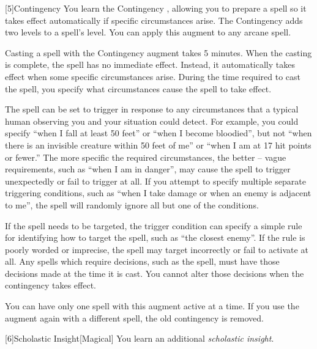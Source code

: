         [5]{Contingency}  You learn the Contingency , allowing you to prepare a spell so it takes effect automatically if specific circumstances arise.
        The Contingency  adds two levels to a spell's level.
        You can apply this augment to any arcane spell.

        Casting a spell with the Contingency augment takes 5 minutes.
        When the casting is complete, the spell has no immediate effect.
        Instead, it automatically takes effect when some specific circumstances arise.
        During the time required to cast the spell, you specify what circumstances cause the spell to take effect.

        The spell can be set to trigger in response to any circumstances that a typical human observing you and your situation could detect.
        For example, you could specify ``when I fall at least 50 feet'' or ``when I become bloodied'', but not ``when there is an invisible creature within 50 feet of me'' or ``when I am at 17 hit points or fewer.''
        The more specific the required circumstances, the better -- vague requirements, such as ``when I am in danger'', may cause the spell to trigger unexpectedly or fail to trigger at all.
        If you attempt to specify multiple separate triggering conditions, such as ``when I take damage or when an enemy is adjacent to me'', the spell will randomly ignore all but one of the conditions.

        If the spell needs to be targeted, the trigger condition can specify a simple rule for identifying how to target the spell, such as ``the closest enemy''.
        If the rule is poorly worded or imprecise, the spell may target incorrectly or fail to activate at all.
        Any spells which require decisions, such as the  spell, must have those decisions made at the time it is cast.
        You cannot alter those decisions when the contingency takes effect.

        You can have only one spell with this augment active at a time.
        If you use the augment again with a different spell, the old contingency is removed.

        [6]{Scholastic Insight}[Magical]
        You learn an additional \textit{scholastic insight}.

